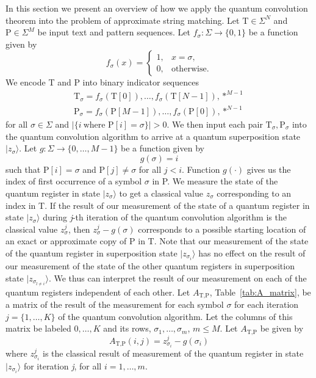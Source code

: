 In this section we present an overview of how we apply the quantum convolution theorem into the problem of approximate string matching. Let $\text{T} \in \Sigma^N$ and $\text{P} \in \Sigma^M$ be input text and pattern sequences. Let $f_{\sigma}:\Sigma \rightarrow \{0,1\}$ be a function given by
\[
	f_{\sigma}(x)=
	\begin{cases}
		1, & x = \sigma,\\
		0, & \mathrm{otherwise.}
	\end{cases}
\]
We encode T and P into binary indicator sequences 
\begin{equation*}
	\begin{split}
		\text{T}_{\sigma}= f_{\sigma}\left(\text{T}[0]\right), \ldots, f_{\sigma}\left(\text{T}[N-1]\right),\ast^{M-1}\\
		\text{P}_{\sigma}= f_{\sigma}\left(\text{P}[M-1]\right), \ldots, f_{\sigma}\left(\text{P}[0]\right),\ast^{N-1}
	\end{split}	
\end{equation*}
for all $\sigma \in \Sigma$ and $\vert \{ i\ \text{where P}[i]=\sigma \} \vert > 0$. We then input each pair $\text{T}_{\sigma}, \text{P}_{\sigma}$ into the quantum convolution algorithm to arrive at a quantum superposition state $\vert z_{\sigma} \rangle$. Let $g:\Sigma \rightarrow \{0,\ldots,M-1\}$ be a function given by
\[
	g(\sigma)= i 
\]
such that $\text{P}[i]=\sigma$ and $\text{P}[j] \neq \sigma$ for all $j < i$. Function $g(\cdot)$ gives us the index of first occurrence of a symbol $\sigma$ in P. We measure the state of the quantum register in state $\vert z_{\sigma} \rangle$ to get a classical value $z_{\sigma}$ corresponding to an index in T. If the result of our measurement of the state of a quantum register in state $\vert z_{\sigma} \rangle$ during \textit{j}-th iteration of the quantum convolution algorithm is the classical value $z_{\sigma}^j$, then $z_{\sigma}^j - g(\sigma)$ corresponds to a possible starting location of an exact or approximate copy of P in T. Note that our measurement of the state of the quantum register in superposition state $\vert z_{\sigma_i} \rangle$ has no effect on the result of our measurement of the state of the other quantum registers in superposition state $\vert z_{\sigma_{l\neq i}} \rangle$. We thus can interpret the result of our measurement on each of the quantum registers independent of each other. Let $A_{\text{T},\text{P}}$, Table~\ref{tab:A_matrix}, be a matrix of the result of the measurement for each symbol $\sigma$ for each iteration $j=\{1,\ldots,K\}$ of the quantum convolution algorithm. Let the columns of this matrix be labeled $0,\ldots,K$ and its rows, $\sigma_1,\ldots,\sigma_m$, $m \leq M$. Let $A_{\text{T},\text{P}}$ be given by 
\[
	A_{\text{T},\text{P}}(i,j) = z_{\sigma_i}^j - g(\sigma_i)
\]
where $z_{\sigma_i}^j$ is the classical result of measurement of the quantum register in state $\vert z_{\sigma_i} \rangle$ for iteration \textit{j}, for all $i=1,\ldots,m$.

